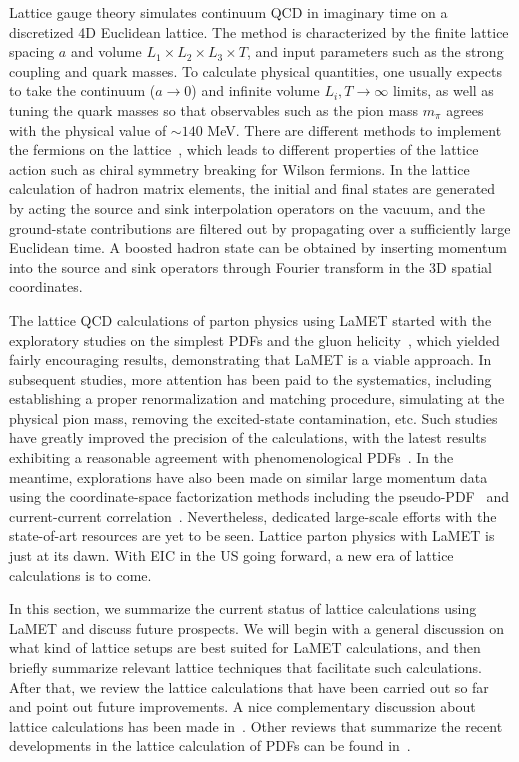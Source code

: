\documentclass[aps,rmp,reprint,amsmath,amssymb,graphicx,longbibliography]{revtex4-1} %
\begin{document}
Lattice gauge theory simulates continuum QCD in imaginary time on a discretized 4D Euclidean lattice. The method is characterized by the finite lattice spacing $a$ and volume $L_1\times L_2\times L_3\times T$, and input parameters such as the strong coupling and quark masses. To calculate physical quantities, one usually expects to take the continuum ($a\to0$) and infinite volume $L_i, T\to\infty$ limits, as well as tuning the quark masses so that observables such as the pion mass $m_\pi$ agrees with the physical value of $\sim 140$ MeV. There are different methods to implement the fermions on the lattice~\cite{Rothe:1992nt}, which leads to different properties of the lattice action such as chiral symmetry breaking for Wilson fermions. In the lattice calculation of hadron matrix elements, the initial and final states are generated by acting the source and sink interpolation operators on the vacuum, and the ground-state contributions are filtered out by propagating over a sufficiently large Euclidean time. A boosted hadron state can be obtained by inserting momentum into the source and sink operators through Fourier transform in the 3D spatial coordinates.

The lattice QCD calculations of parton physics using LaMET started with the exploratory studies on the simplest PDFs and the gluon helicity~\cite{Lin:2014zya,Alexandrou:2015rja,Yang:2016plb}, which yielded fairly encouraging results, demonstrating that LaMET is a viable approach.
%
In subsequent studies, more attention has been paid to the systematics,
including establishing a proper renormalization and matching procedure, simulating at the physical pion mass, removing the excited-state contamination, etc. Such studies have greatly improved the precision of the calculations, with the latest results exhibiting a reasonable agreement with phenomenological PDFs~\cite{Alexandrou:2018pbm,Lin:2018qky,Alexandrou:2018eet,Izubuchi:2019lyk,Gao:2020ito}. In the meantime, explorations have also been made on similar large momentum data using the coordinate-space factorization methods including the pseudo-PDF~\cite{Orginos:2017kos,Joo:2019bzr,Joo:2019jct,Joo:2020spy} and current-current correlation~\cite{Bali:2019dqc,Sufian:2019bol,Sufian:2020vzb}.
%
Nevertheless, dedicated large-scale efforts with the state-of-art resources are yet to be seen. Lattice parton physics with LaMET is just at its dawn. With EIC
in the US going forward, a new era of lattice calculations is to come.

In this section, we summarize the current status of lattice calculations using LaMET and discuss future prospects.
We will begin with a general discussion on what kind of lattice setups are best suited for
LaMET calculations, and then briefly summarize relevant lattice techniques that facilitate such
calculations. After that, we review the lattice calculations that have been carried out so far and
point out future improvements. A nice complementary discussion about
lattice calculations has been made in~\cite{Cichy:2018mum}. Other reviews that summarize the recent developments in the lattice calculation of PDFs can be found in~\cite{Monahan:2018euv,Zhao:2020vll,Constantinou:2020pek}.
\end{document}
